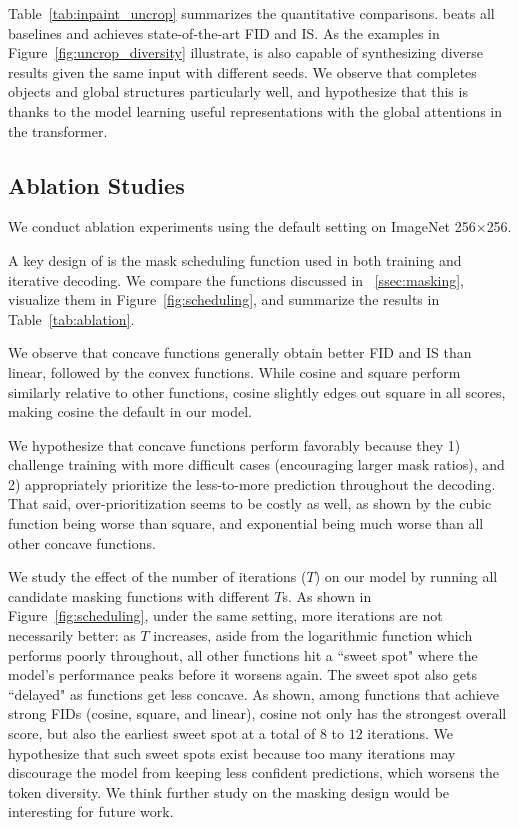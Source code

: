 Table~\ref{tab:inpaint_uncrop} summarizes the quantitative comparisons. \model beats all baselines and achieves state-of-the-art FID and IS. As the examples in Figure~\ref{fig:uncrop_diversity} illustrate, \model is also capable of synthesizing diverse results given the same input with different seeds. We observe that \model completes objects and global structures particularly well, and hypothesize that this is thanks to the model learning useful representations with the global attentions in the transformer.

\subsection{Ablation Studies}

\label{ssec:ablation}
We conduct ablation experiments using the default setting on ImageNet 256$\times$256.

A key design of \model is the mask scheduling function used in both training and iterative decoding. We compare the functions discussed in ~\ref{ssec:masking}, visualize them in Figure~\ref{fig:scheduling}, and summarize the results in Table~\ref{tab:ablation}.

We observe that concave functions generally obtain better FID and IS than linear, followed by the convex functions. While cosine and square perform similarly relative to other functions, cosine slightly edges out square in all scores, making cosine the default in our model.

We hypothesize that concave functions perform favorably because they 1) challenge training with more difficult cases (\ie encouraging larger mask ratios), and 2) appropriately prioritize the less-to-more prediction throughout the decoding.
That said, over-prioritization seems to be costly as well, as shown by the cubic function being worse than square, and exponential being much worse than all other concave functions.



We study the effect of the number of iterations ($T$) on our model by running all candidate masking functions with different $T$s. As shown in Figure~\ref{fig:scheduling}, under the same setting, more iterations are not necessarily better: as $T$ increases, aside from the logarithmic function which performs poorly throughout, all other functions hit a ``sweet spot" where the model's performance peaks before it worsens again. The sweet spot also gets ``delayed" as functions get less concave. As shown, among functions that achieve strong FIDs (\ie cosine, square, and linear), cosine not only has the strongest overall score, but also the earliest sweet spot at a total of $8$ to $12$ iterations.
We hypothesize that such sweet spots exist because too many iterations may discourage the model from keeping less confident predictions, which worsens the token diversity. We think further study on the masking design would be interesting for future work.
